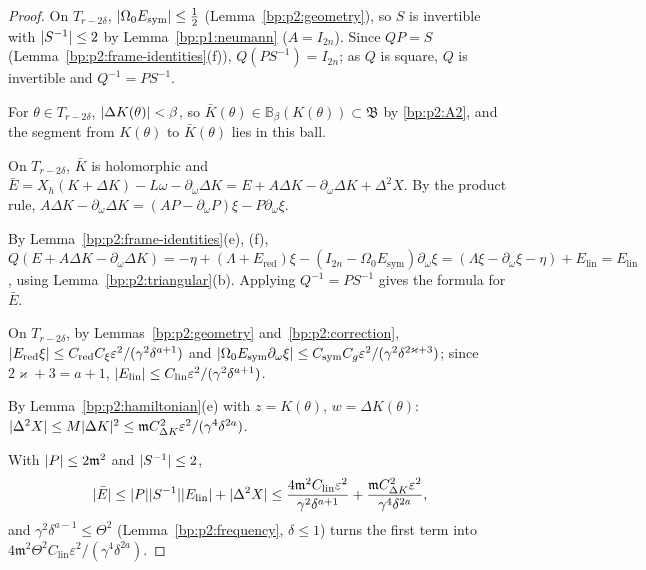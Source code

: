 \begin{proof}
\label{step:p2:ne-invert}
On $T_{r-2\delta}$, $\lvert \Omega_0E_{\mathrm{sym}}\rvert\le\frac12$ (Lemma~\ref{bp:p2:geometry}), so
$S$ is invertible with $\lvert S^{-1}\rvert\le2$ by Lemma~\ref{bp:p1:neumann} ($A=I_{2n}$). Since $QP=S$
(Lemma~\ref{bp:p2:frame-identities}(f)), $Q(PS^{-1})=I_{2n}$; as $Q$ is square, $Q$ is invertible and
$Q^{-1}=PS^{-1}$.

\label{step:p2:ne-domain}
For $\theta\in T_{r-2\delta}$, $\lvert \Delta K(\theta)\rvert<\beta$, so $\bar K(\theta)\in\mathbb
B_\beta(K(\theta))\subset\mathfrak B$ by \ref{bp:p2:A2}, and the segment from $K(\theta)$ to
$\bar K(\theta)$ lies in this ball.

\label{step:p2:ne-expand}
On $T_{r-2\delta}$, $\bar K$ is holomorphic and
$\bar E=X_h(K+\Delta K)-L\omega-\partial_\omega\Delta K=E+A\Delta K-\partial_\omega\Delta K+\Delta^2X$.
By the product rule, $A\Delta K-\partial_\omega\Delta K=(AP-\partial_\omega P)\xi-P\partial_\omega\xi$.

\label{step:p2:ne-reduce}
By Lemma~\ref{bp:p2:frame-identities}(e), (f),
$Q(E+A\Delta K-\partial_\omega\Delta K)=-\eta+(\Lambda+E_{\mathrm{red}})\xi-(I_{2n}-\Omega_0
E_{\mathrm{sym}})\partial_\omega\xi=(\Lambda\xi-\partial_\omega\xi-\eta)+E_{\mathrm{lin}}=E_{\mathrm{lin}}$,
using Lemma~\ref{bp:p2:triangular}(b). Applying $Q^{-1}=PS^{-1}$ gives the formula for $\bar E$.

\label{step:p2:ne-lin}
On $T_{r-2\delta}$, by Lemmas~\ref{bp:p2:geometry} and~\ref{bp:p2:correction},
$\lvert E_{\mathrm{red}}\xi\rvert\le C_{\mathrm{red}}C_\xi\varepsilon^2/(\gamma^2\delta^{a+1})$ and
$\lvert \Omega_0E_{\mathrm{sym}}\partial_\omega\xi\rvert\le C_{\mathrm{sym}}C_g\varepsilon^2/(\gamma^2
\delta^{2\varkappa+3})$; since $2\varkappa+3=a+1$, $\lvert E_{\mathrm{lin}}\rvert\le C_{\mathrm{lin}}
\varepsilon^2/(\gamma^2\delta^{a+1})$.

\label{step:p2:ne-quad}
By Lemma~\ref{bp:p2:hamiltonian}(e) with $z=K(\theta)$, $w=\Delta K(\theta)$:
$\lvert \Delta^2X\rvert\le M\lvert \Delta K\rvert^2\le\mathfrak mC_{\Delta K}^2\varepsilon^2/(\gamma^4\delta^{2a})$.

\label{step:p2:ne-total}
With $\lvert P\rvert\le2\mathfrak m^2$ and $\lvert S^{-1}\rvert\le2$,
\[
\lvert \bar E\rvert\le\lvert P\rvert\lvert S^{-1}\rvert\lvert E_{\mathrm{lin}}\rvert+\lvert \Delta^2X\rvert\le
\frac{4\mathfrak m^2C_{\mathrm{lin}}\varepsilon^2}{\gamma^2\delta^{a+1}}+
\frac{\mathfrak mC_{\Delta K}^2\varepsilon^2}{\gamma^4\delta^{2a}},
\]
and $\gamma^2\delta^{a-1}\le\Theta^2$ (Lemma~\ref{bp:p2:frequency}, $\delta\le1$) turns the first term into
$4\mathfrak m^2\Theta^2C_{\mathrm{lin}}\varepsilon^2/(\gamma^4\delta^{2a})$.
\end{proof}

